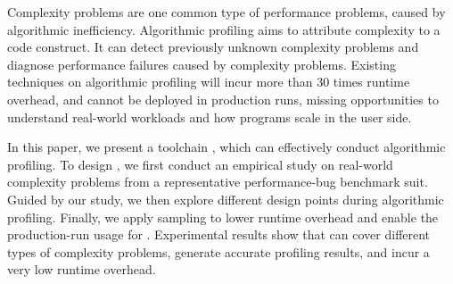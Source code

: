 Complexity problems are one common type of performance problems, 
caused by algorithmic inefficiency. 
Algorithmic profiling aims to attribute complexity to a code construct.
It can detect previously unknown complexity problems and diagnose performance failures 
caused by complexity problems. 
Existing techniques on algorithmic profiling 
will incur more than $30$ times runtime overhead,
and cannot be deployed in production runs, missing opportunities to understand 
real-world workloads and how programs scale in the user side. 

In this paper, we present a toolchain \Tool, 
which can effectively conduct algorithmic profiling. 
To design \Tool, we first conduct an empirical study on 
real-world complexity problems from a representative performance-bug benchmark suit. 
Guided by our study, 
we then explore different 
design points during algorithmic profiling.
Finally, we apply sampling to lower runtime 
overhead and enable the production-run usage for \Tool.
Experimental results show that \Tool 
can cover different types of complexity problems, 
generate accurate profiling results, 
and incur a very low runtime overhead. 

